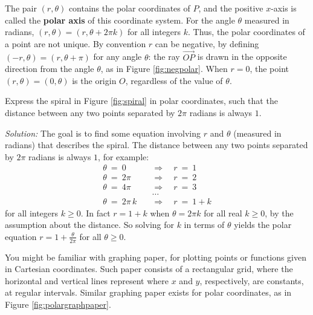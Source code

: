 The pair $(r,\theta)$ contains the polar coordinates of $P$, and the positive
$x$-axis is called the \textbf{polar axis} of this coordinate
system. For the angle $\theta$ measured in radians,
$(r,\theta) = (r,\theta + 2\pi k)$ for all integers $k$. Thus, the polar
coordinates of a point are not unique.
By convention $r$ can be negative, by defining $(-r,\theta) =
(r,\theta + \pi)$ for any angle $\theta$: the ray $\overrightarrow{OP}$
is drawn in the opposite direction from the angle $\theta$, as in Figure
\ref{fig:negpolar}. When $r=0$, the point $(r,\theta) = (0,\theta)$ is the
origin $O$, regardless of the value of $\theta$.

\begin{exmp}\label{exmp:spiral}
\noindent Express the spiral in Figure \ref{fig:spiral} in polar coordinates,
such that the distance between any two points separated by $2\pi$ radians is
always $1$.\vspace{1mm}
\par\noindent\emph{Solution:} The goal is to find some equation involving $r$
and $\theta$ (measured in radians) that describes the spiral. The distance
between any two points separated by $2\pi$ radians is always $1$, for example:
\begin{align*}
 \theta ~=~ 0 \quad&\Rightarrow\quad r ~=~ 1\\
 \theta ~=~ 2\pi \quad&\Rightarrow\quad r ~=~ 2\\
 \theta ~=~ 4\pi \quad&\Rightarrow\quad r ~=~ 3\\
 &\ldots\\
 \theta ~=~ 2\pi\,k \quad&\Rightarrow\quad r ~=~ 1+k
\end{align*}
for all integers $k \ge 0$. In fact $r=1+k$ when $\theta = 2\pi k$ for all real
$k \ge 0$, by the assumption about the distance. So solving for $k$ in terms of
$\theta$ yields the polar equation $r = 1 + \frac{\theta}{2\pi}$ for all
$\theta \ge 0$.
\end{exmp}\vspace{-1mm}
\divider
\newpage
You might be familiar with graphing paper, for plotting points or functions
given in Cartesian coordinates. Such paper consists of a rectangular grid, where
the horizontal and vertical lines represent where $x$ and $y$, respectively, are
constants, at regular intervals. Similar graphing paper exists for polar
coordinates, as in Figure \ref{fig:polargraphpaper}.

